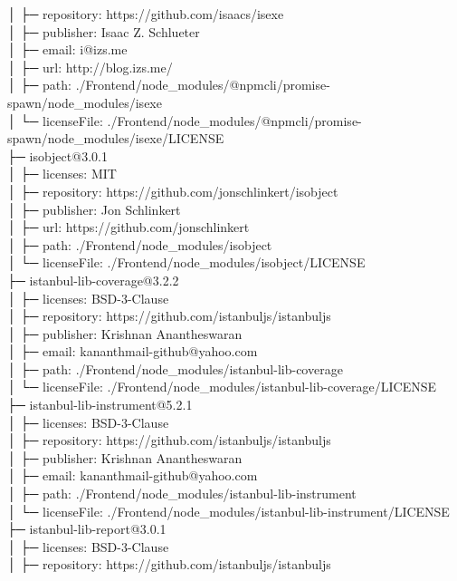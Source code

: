 │  ├─ repository: https://github.com/isaacs/isexe\\
│  ├─ publisher: Isaac Z. Schlueter\\
│  ├─ email: i@izs.me\\
│  ├─ url: http://blog.izs.me/\\
│  ├─ path: ./Frontend/node\_modules/@npmcli/promise-spawn/node\_modules/isexe\\
│  └─ licenseFile: ./Frontend/node\_modules/@npmcli/promise-spawn/node\_modules/isexe/LICENSE\\
├─ isobject@3.0.1\\
│  ├─ licenses: MIT\\
│  ├─ repository: https://github.com/jonschlinkert/isobject\\
│  ├─ publisher: Jon Schlinkert\\
│  ├─ url: https://github.com/jonschlinkert\\
│  ├─ path: ./Frontend/node\_modules/isobject\\
│  └─ licenseFile: ./Frontend/node\_modules/isobject/LICENSE\\
├─ istanbul-lib-coverage@3.2.2\\
│  ├─ licenses: BSD-3-Clause\\
│  ├─ repository: https://github.com/istanbuljs/istanbuljs\\
│  ├─ publisher: Krishnan Anantheswaran\\
│  ├─ email: kananthmail-github@yahoo.com\\
│  ├─ path: ./Frontend/node\_modules/istanbul-lib-coverage\\
│  └─ licenseFile: ./Frontend/node\_modules/istanbul-lib-coverage/LICENSE\\
├─ istanbul-lib-instrument@5.2.1\\
│  ├─ licenses: BSD-3-Clause\\
│  ├─ repository: https://github.com/istanbuljs/istanbuljs\\
│  ├─ publisher: Krishnan Anantheswaran\\
│  ├─ email: kananthmail-github@yahoo.com\\
│  ├─ path: ./Frontend/node\_modules/istanbul-lib-instrument\\
│  └─ licenseFile: ./Frontend/node\_modules/istanbul-lib-instrument/LICENSE\\
├─ istanbul-lib-report@3.0.1\\
│  ├─ licenses: BSD-3-Clause\\
│  ├─ repository: https://github.com/istanbuljs/istanbuljs\\
